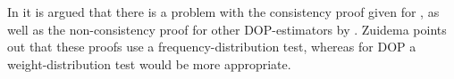 In \cite{zuidema2006} it is argued that there is a problem with the consistency proof given for \dops{}, as well as the non-consistency proof for other DOP-estimators by \cite{johnson2002}. Zuidema points out that these proofs use a frequency-distribution test, whereas for DOP a weight-distribution test would be more appropriate. 






















